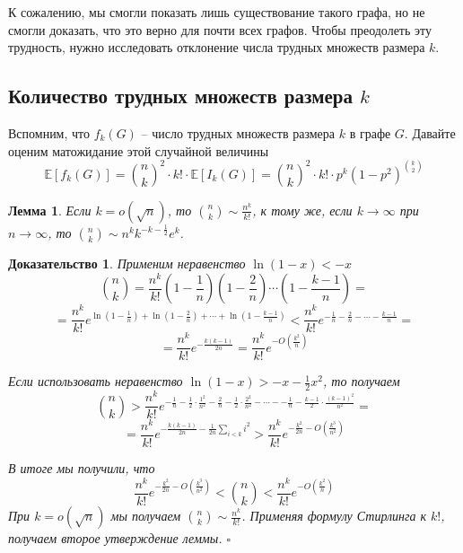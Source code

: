 \documentclass[a4paper]{article}
\newtheorem*{mlemma}{Лемма}
\newtheorem*{msolution}{Доказательство}
\begin{document}
К сожалению, мы смогли показать лишь существование такого графа, но не смогли доказать, что это верно 
для почти всех графов. Чтобы преодолеть эту трудность, нужно исследовать отклонение числа трудных множеств 
размера $k$.

\subsection{Количество трудных множеств размера $k$}

Вспомним, что $f_k(G)$ -- число трудных множеств размера $k$ в графе $G$. Давайте оценим 
матожидание этой случайной величины $$\mathbb{E}[f_k(G)] = \binom{n}{k}^2\cdot k!\cdot \mathbb{E}[I_k(G)] = 
\binom{n}{k}^2\cdot k!\cdot p^k(1-p^2)^{\binom{k}{2}}$$

\begin{mlemma}
    Если $k = o(\sqrt{n})$, то $\binom{n}{k} \sim \frac{n^k}{k!}$, к тому же, если $k \rightarrow \infty$ 
    при $n \rightarrow \infty$, то $\binom{n}{k} \sim n^k k^{-k-\frac{1}{2}}e^k$.
\end{mlemma}

\begin{msolution}
    Применим неравенство $\ln(1-x) < -x$ $$\binom{n}{k} = \frac{n^k}{k!}\left(1-\frac{1}{n}\right)
    \left(1-\frac{2}{n}\right)\cdots\left(1-\frac{k-1}{n}\right) = $$ $$ = \frac{n^k}{k!}e^{\ln\left(1-\frac{1}{n}\right) + 
    \ln\left(1-\frac{2}{n}\right) + \cdots + \ln\left(1-\frac{k-1}{n}\right)} < \frac{n^k}{k!}e^{-\frac{1}{n} -
    \frac{2}{n}-\cdots -\frac{k-1}{n}} = $$ $$ = \frac{n^k}{k!}e^{-\frac{k(k-1)}{2n}} = \frac{n^k}{k!}e^{-O\left(\frac{k^2}{n}\right)}$$
    
    Если использовать неравенство $\ln(1-x) > -x - \frac{1}{2}x^2$, то получаем $$\binom{n}{k} > 
    \frac{n^k}{k!}e^{-\frac{1}{n} - \frac{1}{2}\cdot\frac{1^2}{n^2} - \frac{2}{n} - \frac{1}{2}\cdot\frac{2^2}{n^2} - 
    \cdots - -\frac{1}{n} - \frac{k-1}{2}\cdot\frac{(k-1)^2}{n^2}} = $$ $$ = \frac{n^k}{k!}e^{-\frac{k(k-1)}{2n}-
    \frac{1}{2n}\sum\limits_{i<k}i^2}  > \frac{n^k}{k!}e^{-\frac{k^2}{2n}-O\left(\frac{k^3}{n^2}\right)}$$
    
    В итоге мы получили, что $$\frac{n^k}{k!}e^{-\frac{k^2}{2n}-O\left(\frac{k^3}{n^2}\right)} < \binom{n}{k} < 
    \frac{n^k}{k!}e^{-O\left(\frac{k^2}{n}\right)}$$ При $k = o(\sqrt{n})$ мы получаем $\binom{n}{k} \sim \frac{n^k}{k!}$.
    Применяя формулу Стирлинга к $k!$, получаем второе утверждение леммы. $\square$
\end{msolution}
    
\end{document}
